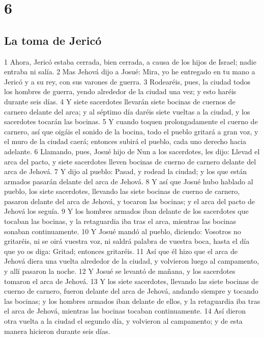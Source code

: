 \chapter{6}

\section*{La toma de Jericó}


1 Ahora, Jericó estaba cerrada, bien cerrada, a causa de los hijos de Israel; nadie entraba ni salía.
2 Mas Jehová dijo a Josué: Mira, yo he entregado en tu mano a Jericó y a su rey, con sus varones de guerra.
3 Rodearéis, pues, la ciudad todos los hombres de guerra, yendo alrededor de la ciudad una vez; y esto haréis durante seis días.
4 Y siete sacerdotes llevarán siete bocinas de cuernos de carnero delante del arca; y al séptimo día daréis siete vueltas a la ciudad, y los sacerdotes tocarán las bocinas.
5 Y cuando toquen prolongadamente el cuerno de carnero, así que oigáis el sonido de la bocina, todo el pueblo gritará a gran voz, y el muro de la ciudad caerá; entonces subirá el pueblo, cada uno derecho hacia adelante.
6 Llamando, pues, Josué hijo de Nun a los sacerdotes, les dijo: Llevad el arca del pacto, y siete sacerdotes lleven bocinas de cuerno de carnero delante del arca de Jehová.
7 Y dijo al pueblo: Pasad, y rodead la ciudad; y los que están armados pasarán delante del arca de Jehová.
8 Y así que Josué hubo hablado al pueblo, los siete sacerdotes, llevando las siete bocinas de cuerno de carnero, pasaron delante del arca de Jehová, y tocaron las bocinas; y el arca del pacto de Jehová los seguía.
9 Y los hombres armados iban delante de los sacerdotes que tocaban las bocinas, y la retaguardia iba tras el arca, mientras las bocinas sonaban continuamente.
10 Y Josué mandó al pueblo, diciendo: Vosotros no gritaréis, ni se oirá vuestra voz, ni saldrá palabra de vuestra boca, hasta el día que yo os diga: Gritad; entonces gritaréis.
11 Así que él hizo que el arca de Jehová diera una vuelta alrededor de la ciudad, y volvieron luego al campamento, y allí pasaron la noche.
12 Y Josué se levantó de mañana, y los sacerdotes tomaron el arca de Jehová.
13 Y los siete sacerdotes, llevando las siete bocinas de cuerno de carnero, fueron delante del arca de Jehová, andando siempre y tocando las bocinas; y los hombres armados iban delante de ellos, y la retaguardia iba tras el arca de Jehová, mientras las bocinas tocaban continuamente.
14 Así dieron otra vuelta a la ciudad el segundo día, y volvieron al campamento; y de esta manera hicieron durante seis días.
